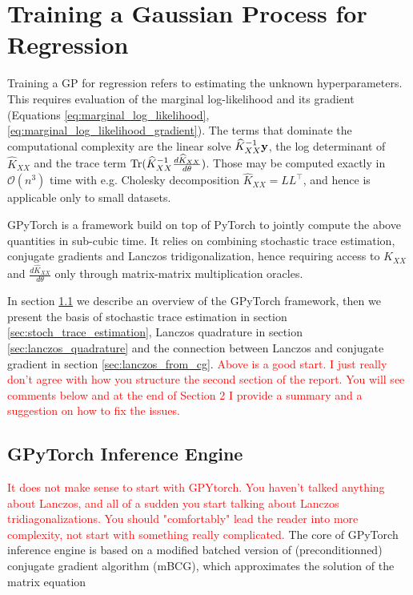 \documentclass{article}
\begin{document}
{



\section{Training a Gaussian Process for Regression} \label{sec:training}

Training a GP for regression refers to estimating the unknown hyperparameters. This requires evaluation of the marginal log-likelihood and its gradient (Equations \eqref{eq:marginal_log_likelihood}, \eqref{eq:marginal_log_likelihood_gradient}). The terms that dominate the computational complexity are the linear solve $\widehat K_{XX}^{-1} \boldsymbol{\mathbf{y}}$, the log determinant of $\hat K_{XX}$ and the trace term $\operatorname{Tr} ( \widehat K_{XX}^{-1} \frac{d \widehat K_{XX}}{d\theta} )$. Those may be computed exactly in $\mathcal O(n^3)$ time with e.g. Cholesky decomposition $\widehat K_{XX} = LL^\top$, and hence is applicable only to small datasets. 

GPyTorch \cite{gardner_gpytorch_2021} is a framework build on top of PyTorch to jointly compute the above quantities in sub-cubic time. 
It relies on combining stochastic trace estimation, conjugate gradients and Lanczos tridigonalization, hence requiring access to $\widehat K_{XX}$ and $\frac{d \widehat K_{XX}}{d\theta}$ only through matrix-matrix multiplication oracles. 

In section \ref{sec:gpytorch} we describe an overview of the GPyTorch framework, then we present the basis of stochastic trace estimation in section \ref{sec:stoch_trace_estimation}, Lanczos quadrature in section \ref{sec:lanczos_quadrature} and the connection between Lanczos and conjugate gradient in section \ref{sec:lanczos_from_cg}. \textcolor{red}{Above is a good start. I just really don't agree with how you structure the second section of the report. You will see comments below and at the end of Section 2 I provide a summary and a suggestion on how to fix the issues. }

\subsection{GPyTorch Inference Engine} \label{sec:gpytorch}
\textcolor{red}{It does not make sense to start with GPYtorch. You haven't talked anything about Lanczos, and all of a sudden you start talking about Lanczos tridiagonalizations. You should "comfortably" lead the reader into more complexity, not start with something really complicated. }
The core of GPyTorch inference engine is based on a modified batched version of (preconditionned) conjugate gradient algorithm (mBCG), which approximates the solution of the matrix equation

}
\end{document}
